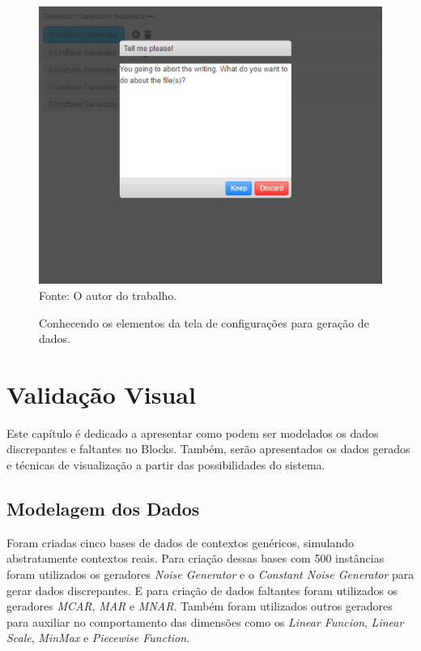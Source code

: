 \documentclass[
	12pt,				%
	openright,			%
	oneside,			%
	a4paper,			%
	english,			%
	brazil				%
	]{abntex2}
\begin{document}
			\begin{figure}[h]
				\centering
				\caption{Conhecendo os elementos da tela de configurações para geração de dados.}
				\includegraphics[width=\linewidth]{./figures/prototipo/modal.png}
				\label{fig:modal}
				\footnotesize Fonte: O autor do trabalho.
			\end{figure}

\chapter{Validação Visual}
	Este capítulo é dedicado a apresentar como podem ser modelados os dados discrepantes e faltantes no Blocks.
	Também, serão apresentados os dados gerados e técnicas de visualização a partir das possibilidades do sistema.
	\par
	
	\section{Modelagem dos Dados}

		Foram criadas cinco bases de dados de contextos genéricos, simulando abstratamente contextos reais.
		Para criação dessas bases com 500 instâncias foram utilizados os geradores
		 \emph{Noise Generator} e o \emph{Constant Noise Generator} para gerar dados discrepantes.
		E para criação de dados faltantes foram utilizados os geradores
		 \emph{MCAR}, \emph{MAR} e \emph{MNAR}.
		Também foram utilizados outros geradores para auxiliar no comportamento das dimensões como os
		 \emph{Linear Funcion}, \emph{Linear Scale}, \emph{MinMax} e 
		 \emph{Piecewise Function}.
		\par
\end{document}
